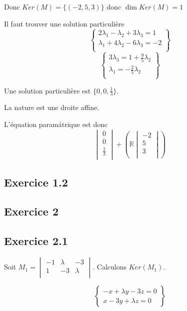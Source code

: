 \documentclass[]{book}
\theoremstyle{definition}
\newcommand{\bb}[1]{\mathbb{#1}}
\newcommand{\R}{\bb{R}}
\begin{document}
Donc $Ker(M) = \{(-2, 5, 3)\}$ donc $\dim Ker(M) = 1$

Il faut trouver une solution particuli\`ere
$$
\left\{ 
    \begin{array}{l}
        2\lambda_1 - \lambda_2 + 3 \lambda_3 = 1 \\
        \lambda_1 + 4 \lambda_2 - 6\lambda_3 = -2 \\
    \end{array}
\right\}
$$
$$
\left\{ 
    \begin{array}{l}
        3\lambda_3 = 1 + \frac{9}{5}\lambda_2 \\
        \lambda_1 = - \frac{2}{5}\lambda_2 \\
    \end{array}
\right\}
$$

Une solution particuli\`ere est $\{0,0,\frac{1}{3}\}$. 

La nature est une droite affine.

L'\'equation param\'atrique est donc
$$
\begin{vmatrix}
    0 \\
    0 \\
    \frac{1}{3} \\
\end{vmatrix}
+
(\R\begin{vmatrix}
   -2 \\
   5 \\
   3 \\ 
\end{vmatrix})
$$

\subsection*{Exercice 1.2}

\subsection*{Exercice 2}
\subsection*{Exercice 2.1}
Soit $M_1=\begin{vmatrix}
    -1 & \lambda & -3 \\
    1 & -3 & \lambda \\
\end{vmatrix}$. Calculons $Ker(M_1)$.

$$
\left\{ 
    \begin{array}{l}
        -x + \lambda y - 3 z = 0 \\
        x - 3 y + \lambda z = 0
    \end{array}
\right\}
$$
\end{document}
